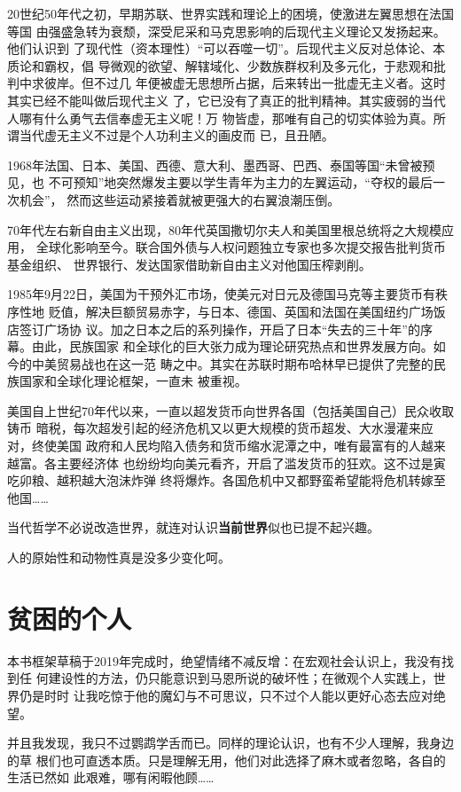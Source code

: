 20世纪50年代之初，早期苏联、世界实践和理论上的困境，使激进左翼思想在法国等国
由强盛急转为衰颓，深受尼采和马克思影响的后现代主义理论又发扬起来。他们认识到
了现代性（资本理性）“可以吞噬一切”。后现代主义反对总体论、本质论和霸权，倡
导微观的欲望、解辖域化、少数族群权利及多元化，于悲观和批判中求彼岸。但不过几
年便被虚无思想所占据，后来转出一批虚无主义者。这时其实已经不能叫做后现代主义
了，它已没有了真正的批判精神。其实疲弱的当代人哪有什么勇气去信奉虚无主义呢！万
物皆虚，那唯有自己的切实体验为真。所谓当代虚无主义不过是个人功利主义的画皮而
已，且丑陋。

1968年法国、日本、美国、西德、意大利、墨西哥、巴西、泰国等国“未曾被预见，也
不可预知”地突然爆发主要以学生青年为主力的左翼运动，“夺权的最后一次机会”，
然而这些运动紧接着就被更强大的右翼浪潮压倒。

70年代左右新自由主义出现，80年代英国撒切尔夫人和美国里根总统将之大规模应用，
全球化影响至今。联合国外债与人权问题独立专家也多次提交报告批判货币基金组织、
世界银行、发达国家借助新自由主义对他国压榨剥削。

1985年9月22日，美国为干预外汇市场，使美元对日元及德国马克等主要货币有秩序性地
贬值，解决巨额贸易赤字，与日本、德国、英国和法国在美国纽约广场饭店签订广场协
议。加之日本之后的系列操作，开启了日本“失去的三十年”的序幕。由此，民族国家
和全球化的巨大张力成为理论研究热点和世界发展方向。如今的中美贸易战也在这一范
畴之中。其实在苏联时期布哈林早已提供了完整的民族国家和全球化理论框架，一直未
被重视。

美国自上世纪70年代以来，一直以超发货币向世界各国（包括美国自己）民众收取铸币
暗税，每次超发引起的经济危机又以更大规模的货币超发、大水漫灌来应对，终使美国
政府和人民均陷入债务和货币缩水泥潭之中，唯有最富有的人越来越富。各主要经济体
也纷纷均向美元看齐，开启了滥发货币的狂欢。这不过是寅吃卯粮、越积越大泡沫炸弹
终将爆炸。各国危机中又都野蛮希望能将危机转嫁至他国……

当代哲学不必说改造世界，就连对认识\textbf{当前世界}似也已提不起兴趣。

人的原始性和动物性真是没多少变化呵。

\section*{贫困的个人}

本书框架草稿于2019年完成时，绝望情绪不减反增：在宏观社会认识上，我没有找到任
何建设性的方法，仍只能意识到马恩所说的破坏性；在微观个人实践上，世界仍是时时
让我吃惊于他的魔幻与不可思议，只不过个人能以更好心态去应对绝望。

并且我发现，我只不过鹦鹉学舌而已。同样的理论认识，也有不少人理解，我身边的草
根们也可直透本质。只是理解无用，他们对此选择了麻木或者忽略，各自的生活已然如
此艰难，哪有闲暇他顾……

